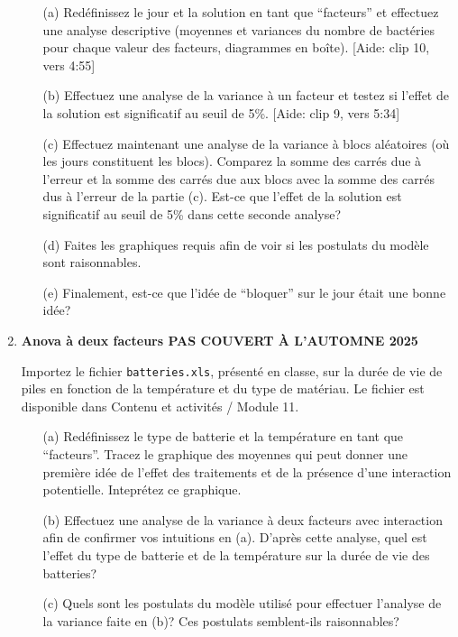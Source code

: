 \documentclass[12pt]{article}
\begin{document}
\begin{enumerate}
\begin{enumerate}
\item[(a)] Redéfinissez le jour et la solution en tant que ``facteurs'' et effectuez une analyse descriptive (moyennes et variances du nombre de bactéries pour chaque  valeur des facteurs, diagrammes en boîte). [Aide: clip 10, vers 4\!\!:55]
\item[(b)] Effectuez une analyse de la variance à un facteur et testez si l'effet de la solution est significatif au seuil de 5\%. [Aide: clip 9, vers 5\!\!:34]
\item[(c)] Effectuez maintenant une analyse de la variance à blocs aléatoires (où les jours constituent les blocs). Comparez la somme des carrés due à l'erreur et la somme des carrés due aux blocs avec la somme des carrés dus à l'erreur de la partie (c). Est-ce que l'effet de la solution est significatif au seuil de 5\% dans cette seconde analyse?
\item[(d)] Faites les graphiques requis afin de voir si les postulats du modèle sont raisonnables.
\item[(e)] Finalement, est-ce que l'idée de ``bloquer'' sur le jour était une bonne idée?
\end{enumerate}



\vspace{0.2in}


\item {\bf Anova à deux facteurs  PAS COUVERT À L'AUTOMNE 2025}

Importez le fichier {\tt batteries.xls}, présenté en classe, sur la durée de vie de piles en fonction de la température et du type de matériau. Le fichier est  disponible dans Contenu et activités / Module 11.
\begin{enumerate}
\item[(a)] Redéfinissez le type de batterie et la température en tant que ``facteurs''. Tracez le graphique des moyennes qui peut donner une première idée de l'effet des traitements et de la présence d'une interaction potentielle. Inteprétez ce graphique.
\item[(b)] Effectuez une analyse de la variance à deux facteurs avec interaction afin de confirmer vos intuitions en (a). D'après cette analyse, quel est l'effet du type de batterie et de la température sur la durée de vie des batteries?
\item[(c)] Quels sont les postulats du modèle utilisé pour effectuer l'analyse de la variance faite en (b)? Ces postulats semblent-ils raisonnables?
\end{enumerate}



\end{enumerate}
\end{document}
